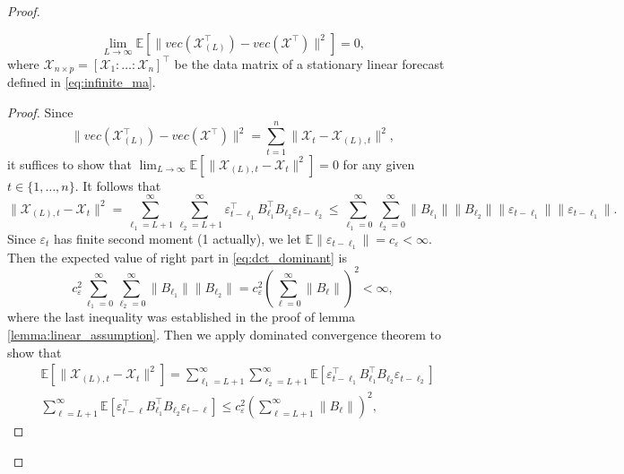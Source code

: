 \begin{proof}
\begin{lem}
\label{lemma:L2_convergence_truncate}
\begin{equation}
\lim_{L\rightarrow \infty}\mathbb{E} \left[ \|vec(\mathcal{\mathcal{X}}_{(L)}^\top) - vec(\mathcal{\mathcal{X}}^\top)\|^2 \right]  = 0,
\end{equation}
where $\mathcal{\mathcal{X}}_{n\times p} = [\mathcal{X}_1: \ldots : \mathcal{X}_n]^\top$ be the data matrix of a stationary linear forecast defined in \eqref{eq:infinite_ma}.
\begin{proof}
Since
\begin{equation}
\|vec(\mathcal{\mathcal{X}}_{(L)}^\top) - vec(\mathcal{\mathcal{X}}^\top)\|^2 = \sum_{t=1}^n \|\mathcal{X}_t-\mathcal{X}_{(L), t}\|^2,
\end{equation}
it suffices to show that $\lim_{L\rightarrow \infty}\mathbb{E} \left[ \|\mathcal{X}_{(L), t} - \mathcal{X}_t\|^2 \right] = 0$ for any given $t\in \{1,\dots, n\}$. It follows that 
\begin{equation}
\label{eq:dct_dominant}
\|\mathcal{X}_{(L), t}-\mathcal{X}_t\|^2 = \sum_{\ell_1=L+1}^\infty \sum_{\ell_2=L+1}^\infty \varepsilon_{t-{\ell_1}}^\top B^\top_{\ell_1} B_{\ell_2}\varepsilon_{t-{\ell_2}} \le \sum_{\ell_1=0}^\infty \sum_{\ell_2=0}^\infty\|B_{\ell_1}\|\|B_{\ell_2}\|\|\varepsilon_{t-{\ell_1}}\|
\|\varepsilon_{t-{\ell_1}}\|.
\end{equation}
Since $\varepsilon_t$ has finite second moment (1 actually), we let 
$\mathbb{E}\|\varepsilon_{t-{\ell_1}}\| = c_\varepsilon <\infty $. Then the expected value of right part in \eqref{eq:dct_dominant} is
\begin{equation}
c_\varepsilon^2 \sum_{\ell_1=0}^{\infty}\sum_{\ell_2=0}^{\infty} \|B_{\ell_1}\| \|B_{\ell_2}\| = c_\varepsilon^2(\sum_{\ell=0}^\infty \|B_{\ell}\|)^2<\infty, 
\end{equation}
where the last inequality was established in the proof of lemma \eqref{lemma:linear_assumption}. Then we apply dominated convergence theorem to show that 
\begin{equation}
\begin{aligned}
&\mathbb{E} \left[\|\mathcal{X}_{(L), t}-\mathcal{X}_t\|^2 \right] = \sum_{\ell_1=L+1}^\infty \sum_{\ell_2=L+1}^\infty \mathbb{E}\left[ \varepsilon_{t-{\ell_1}}^\top B^\top_{\ell_1} B_{\ell_2}\varepsilon_{t-{\ell_2}} \right]\\
& \sum_{\ell=L+1}^\infty \mathbb{E} \left[ \varepsilon_{t-\ell}^\top B^\top_{\ell_1} B_{\ell_2} \varepsilon_{t-\ell} \right] \le c_\varepsilon^2 (\sum_{\ell=L+1}^\infty \|B_\ell\|)^2,

\end{aligned}
\end{equation}
\end{proof}
\end{lem}
\end{proof}
